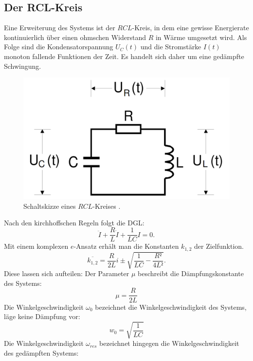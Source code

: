    \subsection{Der RCL-Kreis}
Eine Erweiterung des Systems ist der $RCL$-Kreis, in dem eine gewisse Energierate
kontinuierlich über einen ohmschen Widerstand $R$ in Wärme umgesetzt wird. Als Folge sind
die Kondensatorspannung $U_C(t)$ und die Stromstärke $I(t)$  monoton fallende Funktionen der Zeit. Es handelt sich daher um eine gedämpfte
 Schwingung.
 \begin{figure}[H]
   \centering
   \includegraphics[width=\linewidth-200pt,height=\textheight-200pt,keepaspectratio]{content/RCL.png}
   \caption{Schaltskizze eines $RCL$-Kreises \cite{V354}.}
   \label{fig:RCL_Kreis}
 \end{figure}
Nach den kirchhoffschen Regeln folgt die DGL:
 \begin{equation}
   \ddot{I} + \frac{R}{L} \dot{I} + \frac{1}{LC}I = 0\text{.}
 \end{equation}
 Mit einem komplexen $e$-Ansatz erhält man die Konstanten $k_{1,2}$ der Zielfunktion.
 \begin{equation}
   \overline{k_{1,2}} = \frac{R}{2L}i \pm \sqrt{\frac{1}{LC}-\frac{R²}{4L²}}\text{.}
 \end{equation}
 Diese lassen sich aufteilen:
 Der Parameter $\mu$ beschreibt die Dämpfungskonstante des Systems:
 \begin{equation}
 \mu = \frac{R}{2L}
 \end{equation}
 Die Winkelgeschwindigkeit $\omega_0$ bezeichnet die Winkelgeschwindigkeit des Systems, läge keine Dämpfung vor:
 \begin{equation}
 w_0 = \sqrt{\frac{1}{LC}}
 \end{equation}
 Die Winkelgeschwindigkeit $\omega_{res}$ bezeichnet hingegen die Winkelgeschwindigkeit des gedämpften Systems:
